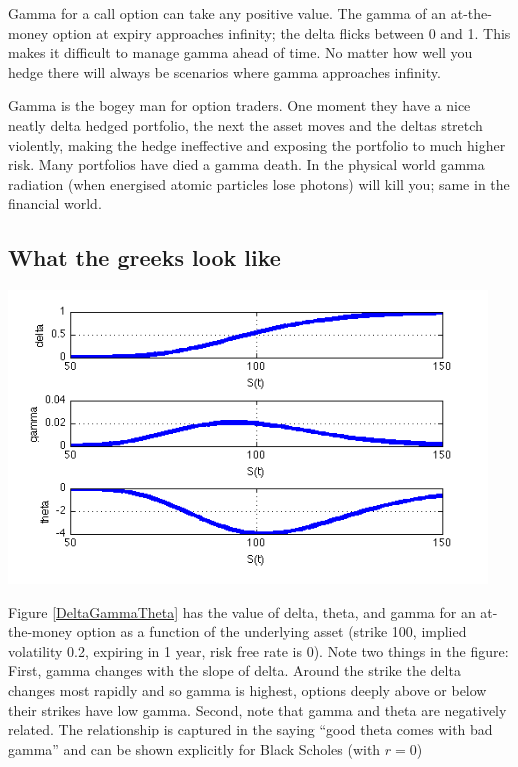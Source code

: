 Gamma for a call option can take any positive value. The gamma of an at-the-money option at expiry approaches infinity; the delta flicks between 0 and 1. This makes it difficult to manage gamma ahead of time. No matter how well you hedge there will always be scenarios where gamma approaches infinity.

Gamma is the bogey man for option traders. One moment they have a nice neatly delta hedged portfolio, the next the asset moves and the deltas stretch violently, making the hedge ineffective and exposing the portfolio to much higher risk. Many portfolios have died a gamma death. In the physical world gamma radiation (when energised atomic particles lose photons) will kill you; same in the financial world.

\subsection{What the greeks look like}

\begin{center}
\includegraphics[width=5in]{pics/DeltaGammaTheta.png}
\label{DeltaGammaTheta}
\end{center}

Figure \ref{DeltaGammaTheta} has the value of delta, theta, and gamma for an at-the-money option as a function of the underlying asset (strike 100, implied volatility 0.2, expiring in 1 year, risk free rate is 0). Note two things in the figure: First, gamma changes with the slope of delta. Around the strike the delta changes most rapidly and so gamma  is highest, options deeply above or below their strikes have low gamma. Second, note that gamma and theta are negatively related. The relationship is captured in the saying ``good theta comes with bad gamma'' and can be shown explicitly for Black Scholes (with $r=0$)

